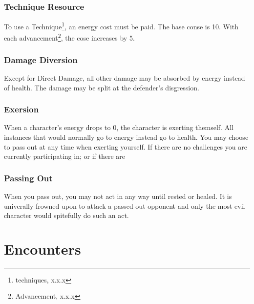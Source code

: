 \subsection{Technique Resource}

To use a Technique\footnote{techniques, x.x.x}, an energy cost must
be paid. The base conse is 10. With each advancement\footnote{Advancement, x.x.x},
the cose increases by 5.

\subsection{Damage Diversion}

Except for Direct Damage, all other damage may be absorbed by energy
instead of health. The damage may be split at the defender's disgression.

\subsection{Exersion}

When a character's energy drops to 0, the character is exerting themself.
All instances that would normally go to energy instead go to health.
You may choose to pass out at any time when exerting yourself. If
there are no challenges you are currently participating in; or if
there are 

\subsection{Passing Out}

When you pass out, you may not act in any way until rested or healed.
It is univerally frowned upon to attack a passed out opponent and
only the most evil character would spitefully do such an act.

\chapter{Encounters}

